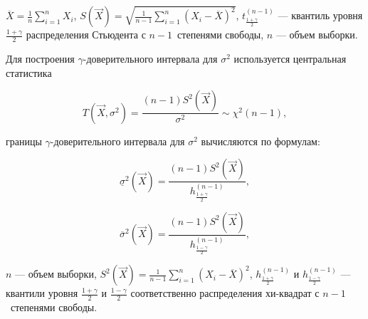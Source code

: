  $\overline X = \frac{1}{n} \sum\limits_{i=1}^{n} X_i$, $S(\vec X) = \sqrt{\frac{1}{n-1} \sum\limits_{i=1}^{n} (X_i - \overline X)^2}$, $t_{\frac{1+\gamma}{2}}^{(n-1)}$ --- квантиль уровня $\frac{1+\gamma}{2}$ распределения Стьюдента с \mbox{$n-1$~степенями} свободы, $n$ --- объем выборки.

Для построения $\gamma$-доверительного интервала для $\sigma^2$ используется
центральная статистика

$$
	\label{eq:T_2}
	T(\vec X, \sigma^2) = \frac{(n-1)S^2(\vec X)}{\sigma^2} \sim \chi^2(n - 1),
$$

 границы $\gamma$-доверительного интервала для $\sigma^2$ вычисляются по
формулам:

$$
	\label{eq:S_quad_lower}
	\underline \sigma^2 (\vec X) = \frac{(n-1)S^2(\vec X)}{h_{\frac{1+\gamma}{2}}^{(n-1)}},
$$

$$
	\label{eq:S_quad_upper}
	\overline \sigma^2 (\vec X) = \frac{(n-1)S^2(\vec X)}{h_{\frac{1-\gamma}{2}}^{(n-1)}},
$$


 $n$ --- объем выборки, $S^2(\vec X) = \frac{1}{n-1} \sum\limits_{i=1}^{n} (X_i - \overline X)^2$, $h_{\frac{1+\gamma}{2}}^{(n-1)}$ и $h_{\frac{1-\gamma}{2}}^{(n-1)}$ --- квантили уровня $\frac{1+\gamma}{2}$ и $\frac{1-\gamma}{2}$ соответственно распределения хи-квадрат с \mbox{$n-1$~степенями} свободы.